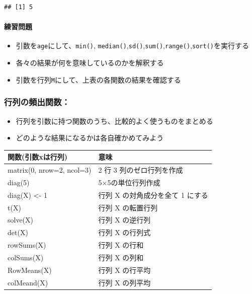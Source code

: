 \documentclass[
]{book}
\providecommand{\tightlist}{%
  \setlength{\itemsep}{0pt}\setlength{\parskip}{0pt}}
\begin{document}
\begin{verbatim}
## [1] 5
\end{verbatim}

\hypertarget{ux7df4ux7fd2ux554fux984c-2}{%
\paragraph*{練習問題}\label{ux7df4ux7fd2ux554fux984c-2}}

\begin{itemize}
\tightlist
\item
  引数を\texttt{age}にして、\texttt{min()}, \texttt{median()},\texttt{sd()},\texttt{sum()},\texttt{range()},\texttt{sort()}を実行する
\item
  各々の結果が何を意味しているのかを解釈する
\item
  引数を行列\texttt{M}にして、上表の各関数の結果を確認する
\end{itemize}

\hypertarget{ux884cux5217ux306eux983bux51faux95a2ux6570}{%
\subsubsection*{行列の頻出関数：}\label{ux884cux5217ux306eux983bux51faux95a2ux6570}}

\begin{itemize}
\tightlist
\item
  行列を引数に持つ関数のうち、比較的よく使うものをまとめる
\item
  どのような結果になるかは各自確かめてみよう
\end{itemize}

\begin{longtable}[]{@{}ll@{}}
\toprule()
関数(引数xは行列) & 意味 \\
\midrule()
\endhead
matrix(0, nrow=2, ncol=3) & 2 行 3 列のゼロ行列を作成 \\
diag(5) & 5×5の単位行列作成 \\
diag(X) \textless- 1 & 行列 X の対角成分を全て 1 にする \\
t(X) & 行列 X の転置行列 \\
solve(X) & 行列 X の逆行列 \\
det(X) & 行列 X の行列式 \\
rowSums(X) & 行列 X の行和 \\
colSums(X) & 行列 X の列和 \\
RowMeans(X) & 行列 X の行平均 \\
colMeand(X) & 行列 X の列平均 \\
\bottomrule()
\end{longtable}
\end{document}
